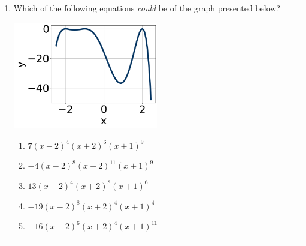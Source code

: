 \documentclass[14pt]{extbook}
\newcommand{\litem}[1]{\item#1\hspace*{-1cm}\rule{\textwidth}{0.4pt}}
\begin{document}
\begin{enumerate}
{\begin{enumerate}[label=\Alph*.]
\end{enumerate} }
\litem{
Which of the following equations \textit{could} be of the graph presented below?
\begin{center}
    \includegraphics[width=0.5\textwidth]{../Figures/polyGraphToFunctionC.png}
\end{center}
\begin{enumerate}[label=\Alph*.]
\item \( 7(x - 2)^{4} (x + 2)^{6} (x + 1)^{9} \)
\item \( -4(x - 2)^{8} (x + 2)^{11} (x + 1)^{9} \)
\item \( 13(x - 2)^{4} (x + 2)^{8} (x + 1)^{6} \)
\item \( -19(x - 2)^{8} (x + 2)^{4} (x + 1)^{4} \)
\item \( -16(x - 2)^{6} (x + 2)^{4} (x + 1)^{11} \)


\end{enumerate}}
\end{enumerate}
\end{document}
